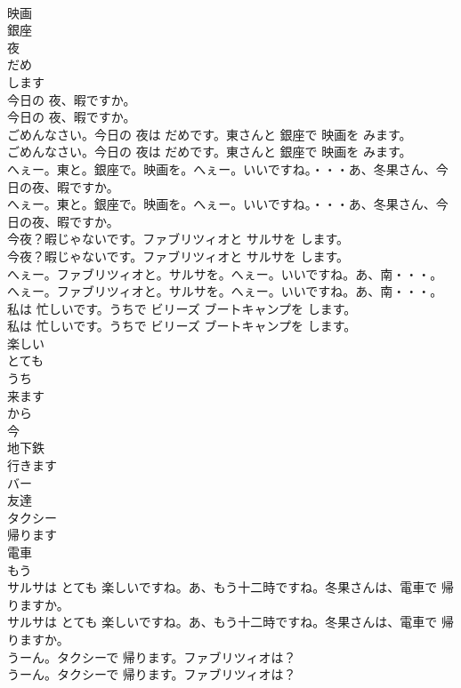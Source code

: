 \documentclass[8pt]{extreport}
\begin{document}
\begin{CJK}{UTF8}{min}
\\	映画
\\	銀座
\\	夜
\\	だめ
\\	します
\\	今日の 夜、暇ですか。	
\\	今日の 夜、暇ですか。 
\\	ごめんなさい。今日の 夜は だめです。東さんと 銀座で 映画を みます。	
\\	ごめんなさい。今日の 夜は だめです。東さんと 銀座で 映画を みます。 
\\	へぇー。東と。銀座で。映画を。へぇー。いいですね。・・・あ、冬果さん、今日の夜、暇ですか。	
\\	へぇー。東と。銀座で。映画を。へぇー。いいですね。・・・あ、冬果さん、今日の夜、暇ですか。 
\\	今夜？暇じゃないです。ファブリツィオと サルサを します。	
\\	今夜？暇じゃないです。ファブリツィオと サルサを します。 
\\	へぇー。ファブリツィオと。サルサを。へぇー。いいですね。あ、南・・・。	
\\	へぇー。ファブリツィオと。サルサを。へぇー。いいですね。あ、南・・・。 
\\	私は 忙しいです。うちで ビリーズ ブートキャンプを します。	
\\	私は 忙しいです。うちで ビリーズ ブートキャンプを します。 
\\	楽しい
\\	とても
\\	うち
\\	来ます
\\	から
\\	今
\\	地下鉄
\\	行きます
\\	バー
\\	友達
\\	タクシー
\\	帰ります
\\	電車
\\	もう
\\	サルサは とても 楽しいですね。あ、もう十二時ですね。冬果さんは、電車で 帰りますか。	
\\	サルサは とても 楽しいですね。あ、もう十二時ですね。冬果さんは、電車で 帰りますか。 
\\	うーん。タクシーで 帰ります。ファブリツィオは？	
\\	うーん。タクシーで 帰ります。ファブリツィオは？ 

\end{CJK}
\end{document}
